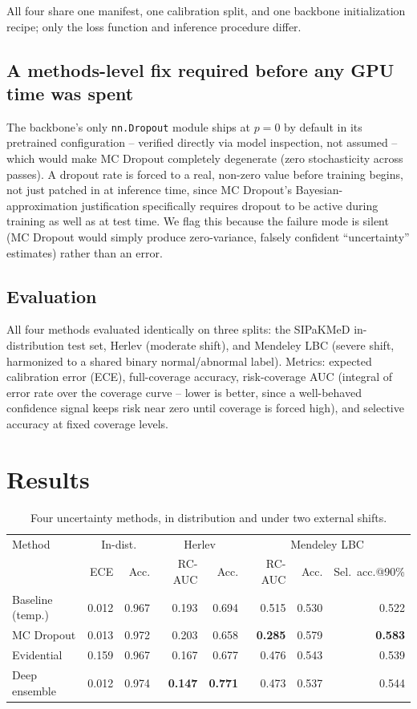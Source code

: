 \documentclass[runningheads]{llncs}
\begin{document}
All four share one manifest, one calibration split, and one backbone
initialization recipe; only the loss function and inference procedure
differ.

\subsection{A methods-level fix required before any GPU time was spent}

The backbone's only \texttt{nn.Dropout} module ships at $p=0$ by default
in its pretrained configuration -- verified directly via model inspection,
not assumed -- which would make MC Dropout completely degenerate (zero
stochasticity across passes). A dropout rate is forced to a real,
non-zero value before training begins, not just patched in at inference
time, since MC Dropout's Bayesian-approximation justification specifically
requires dropout to be active during training as well as at test time. We
flag this because the failure mode is silent (MC Dropout would simply
produce zero-variance, falsely confident ``uncertainty'' estimates) rather
than an error.

\subsection{Evaluation}

All four methods evaluated identically on three splits: the SIPaKMeD
in-distribution test set, Herlev (moderate shift), and Mendeley LBC
(severe shift, harmonized to a shared binary normal/abnormal label).
Metrics: expected calibration error (ECE), full-coverage accuracy,
risk-coverage AUC (integral of error rate over the coverage curve -- lower
is better, since a well-behaved confidence signal keeps risk near zero
until coverage is forced high), and selective accuracy at fixed coverage
levels.

\section{Results}

\begin{table}[htbp]
\centering
\caption{Four uncertainty methods, in distribution and under two external shifts.}
\label{tab:rq2}
\begin{tabular}{lrrrrrrr}
\toprule
Method & \multicolumn{2}{c}{In-dist.} & \multicolumn{2}{c}{Herlev} & \multicolumn{3}{c}{Mendeley LBC} \\
 & ECE & Acc. & RC-AUC & Acc. & RC-AUC & Acc. & Sel.\ acc.@90\% \\
\midrule
Baseline (temp.) & 0.012 & 0.967 & 0.193 & 0.694 & 0.515 & 0.530 & 0.522 \\
MC Dropout & 0.013 & 0.972 & 0.203 & 0.658 & \textbf{0.285} & 0.579 & \textbf{0.583} \\
Evidential & 0.159 & 0.967 & 0.167 & 0.677 & 0.476 & 0.543 & 0.539 \\
Deep ensemble & 0.012 & 0.974 & \textbf{0.147} & \textbf{0.771} & 0.473 & 0.537 & 0.544 \\
\bottomrule
\end{tabular}
\end{table}
\end{document}
